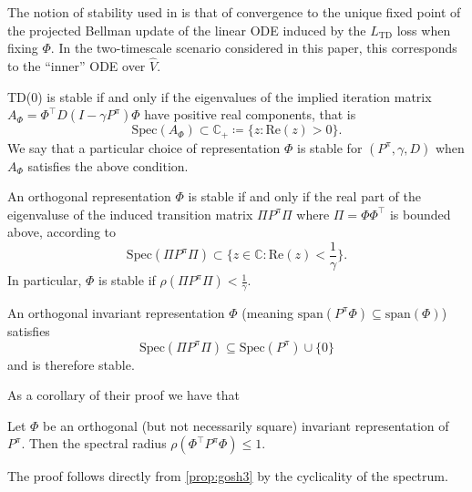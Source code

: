 The notion of stability used in \cite{ghosh2020representations} is that of convergence to the unique fixed point of the projected Bellman update of the linear ODE induced by the $L_\text{TD}$ loss when fixing $\Phi$. In the two-timescale scenario considered in this paper, this corresponds to the ``inner'' ODE over $\hat{V}$.

\begin{lemma}\label{prop:gosh1}
    TD(0) is stable if and only if the eigenvalues of the implied iteration matrix $A_\Phi = \Phi^\top D (I - \gamma P^\pi) \Phi$ have positive real components, that is $$\text{Spec}\left(A_\Phi\right) \subset \mathbb{C}_+ \coloneq \{z : \text{Re}(z) > 0 \}.$$
    We say that a particular choice of representation $\Phi$ is stable for $(P^\pi, \gamma, D)$ when $A_\Phi$ satisfies the above condition.
\end{lemma}

\begin{lemma}\label{prop:gosh2}
    An orthogonal representation $\Phi$ is stable if and only if the real part of the eigenvaluse of the induced transition matrix $\Pi P^\pi \Pi$ where $\Pi = \Phi\Phi^\top$ is bounded above, according to $$\text{Spec}\left(\Pi P^\pi \Pi\right) \subset \{z \in \mathbb{C}: \text{Re}(z) < \frac{1}{\gamma} \}.$$
    In particular, $\Phi$ is stable if $\rho(\Pi P^\pi\Pi) < \frac{1}{\gamma}$.
\end{lemma}

\begin{lemma}\label{prop:gosh3}
    An orthogonal invariant representation $\Phi$ (meaning $\text{span}(P^\pi \Phi) \subseteq \text{span}(\Phi)$) satisfies $$\text{Spec}\left(\Pi P^\pi \Pi\right) \subseteq \text{Spec}(P^\pi) \cup \{0\}$$ and is therefore stable.
\end{lemma}

As a corollary of their proof we have that 

\begin{lemma}\label{gosh:corr}
    Let $\Phi$ be an orthogonal (but not necessarily square) invariant representation of $P^\pi$. Then the spectral radius $\rho(\Phi^\top P^\pi \Phi) \leq 1.$ 
\end{lemma}

The proof follows directly from \autoref{prop:gosh3} by the cyclicality of the spectrum.
    

